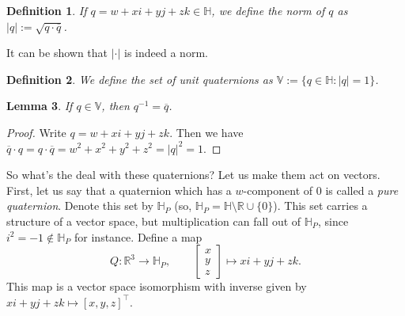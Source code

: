 \documentclass{article}
\newtheorem{definition}{Definition}
\newtheorem{lemma}[definition]{Lemma}
\begin{document}
\begin{definition}
If $q = w+xi+yj+zk \in \mathbb{H}$, we define the \emph{norm} of $q$ as $|q| := \sqrt{q \cdot \overline{q}}$.
\end{definition}
It can be shown that $|\cdot|$ is indeed a norm.

\begin{definition}
We define the set of unit quaternions as $\mathbb{V} := \{q \in \mathbb{H} : |q| = 1\}$.
\end{definition}

\begin{lemma}
If $q \in \mathbb{V}$, then $q^{-1} = \overline{q}$.
\end{lemma}
\begin{proof}
Write $q = w + xi + yj + zk$. Then we have $\overline{q} \cdot q = q \cdot \overline{q} = w^2 + x^2 + y^2 + z^2 = |q|^2 = 1$.
\end{proof}

So what's the deal with these quaternions? Let us make them act on vectors. First, let us say that a quaternion which has a $w$-component of $0$ is called a \emph{pure quaternion}. Denote this set by $\mathbb{H}_P$ (so, $\mathbb{H}_P = \mathbb{H} \setminus \mathbb{R} \cup \{0\}$). This set carries a structure of a vector space, but multiplication can fall out of $\mathbb{H}_P$, since $i^2 = -1 \not\in \mathbb{H}_P$ for instance. Define a map
\[ Q: \mathbb{R}^3 \to \mathbb{H}_P, \qquad \begin{bmatrix} x \\ y \\ z \end{bmatrix} \mapsto xi + yj + zk. \]
This map is a vector space isomorphism with inverse given by $xi +yj + zk \mapsto [x,y,z]^\intercal$.
\end{document}
